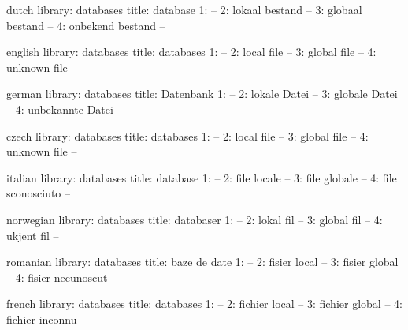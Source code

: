 


\startmessages  dutch  library: databases
  title: database
      1: --
      2: lokaal bestand --
      3: globaal bestand --
      4: onbekend bestand --
\stopmessages

\startmessages  english  library: databases
  title: databases
      1: --
      2: local file --
      3: global file --
      4: unknown file --
\stopmessages

\startmessages  german  library: databases
  title: Datenbank
      1: --
      2: lokale Datei --
      3: globale Datei --
      4: unbekannte Datei --
\stopmessages


\startmessages  czech library: databases
  title: databases
      1: --
      2: local file --
      3: global file --
      4: unknown file --
\stopmessages

\startmessages  italian  library: databases
  title: database
      1: --
      2: file locale --
      3: file globale --
      4: file sconosciuto --
\stopmessages

\startmessages  norwegian  library: databases
  title: databaser
      1: --
      2: lokal fil --
      3: global fil --
      4: ukjent fil --
\stopmessages

\startmessages  romanian  library: databases
  title: baze de date
      1: --
      2: fisier local --
      3: fisier global --
      4: fisier necunoscut --
\stopmessages

\startmessages  french  library: databases
  title: databases
      1: --
      2: fichier local --
      3: fichier global --
      4: fichier inconnu --
\stopmessages

\unprotect

